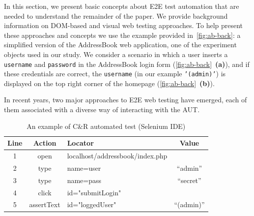 In this section, we present basic concepts
about E2E test automation that are needed 
to understand the remainder of the paper.
We provide background information on 
DOM-based and visual web testing approaches.
To help present these approaches and concepts
we use the example provided in~\autoref{fig:ab-back}: 
a simplified version of the AddressBook web application, 
one of the experiment objects used in our study. 
We consider a scenario in which a user 
inserts a \texttt{username} and \texttt{password} 
in the AddressBook login form 
(\autoref{fig:ab-back}~\textbf{(a)}), 
and if these credentials are correct, 
the \texttt{username} (in our example \texttt{'(admin)'}) is displayed on 
the top right corner of the homepage 
(\autoref{fig:ab-back}~\textbf{(b)}).

In recent years, two major approaches to E2E web testing have emerged, each of them associated with a diverse way of interacting with the AUT. 

\begin{table}[b]
\setlength{\tabcolsep}{3pt}
\renewcommand{\arraystretch}{1}
\centering
\caption{An example of C\&R automated test (Selenium IDE)}
\begin{tabular}{cclc}
\toprule
\textbf{Line} & \textbf{Action}   & \textbf{Locator} & \textbf{Value} \\
\midrule
1 & open             & localhost/addressbook/index.php &                \\
2 & type             & name=user                         &  ``admin''   \\
3 & type             & name=pass                         &  ``secret'' \\
4 & click            & id="submitLogin"                           &           \\
5 & assertText  & id="loggedUser"                           &   ``(admin)''        \\
\bottomrule
\end{tabular}
\label{t:seleniumtest}
\end{table}


